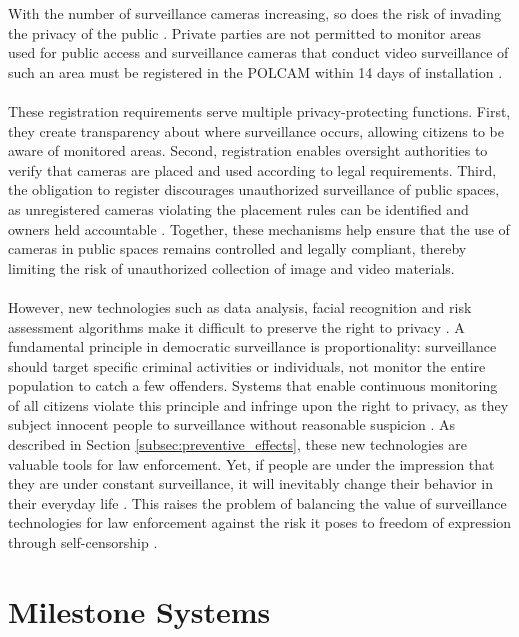 With the number of surveillance cameras increasing, so does the risk of invading the privacy of the public \cite{overvagningsekspert2025}. Private parties are not permitted to monitor areas used for public access \cite{lov_tv_overvaagning2023} and surveillance cameras that conduct video surveillance of such an area must be registered in the \acs{POLCAM} within 14 days of installation \cite{politiet2024registrer}. 
\\\\
These registration requirements serve multiple privacy-protecting functions. First, they create transparency about where surveillance occurs, allowing citizens to be aware of monitored areas. Second, registration enables oversight authorities to verify that cameras are placed and used according to legal requirements. Third, the obligation to register discourages unauthorized surveillance of public spaces, as unregistered cameras violating the placement rules can be identified and owners held accountable \cite{kromann_polcam2021}. Together, these mechanisms help ensure that the use of cameras in public spaces remains controlled and legally compliant, thereby limiting the risk of unauthorized collection of image and video materials.
\\\\
However, new technologies such as data analysis, facial recognition and risk assessment algorithms make it difficult to preserve the right to privacy \cite{overvagningsekspert2025}. A fundamental principle in democratic surveillance is proportionality: surveillance should target specific criminal activities or individuals, not monitor the entire population to catch a few offenders. Systems that enable continuous monitoring of all citizens violate this principle and infringe upon the right to privacy, as they subject innocent people to surveillance without reasonable suspicion \cite{menneskeret_overvaagning,justitia_overvaagning}. As described in Section \ref{subsec:preventive_effects}, these new technologies are valuable tools for law enforcement. Yet, if people are under the impression that they are under constant surveillance, it will inevitably change their behavior in their everyday life \cite{overvagningsekspert2025}. This raises the problem of balancing the value of surveillance technologies for law enforcement against the risk it poses to freedom of expression through self-censorship \cite{overvagningsekspert2025}.

\section{Milestone Systems}

